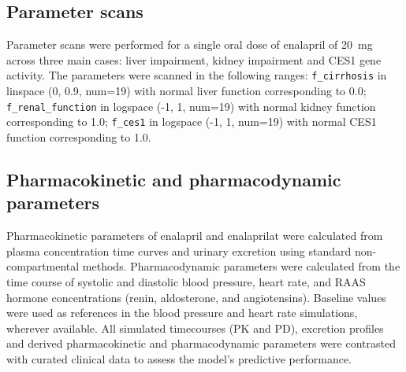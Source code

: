 \subsection{Parameter scans}
\label{sec:methods_scans}
Parameter scans were performed for a single oral dose of enalapril of 20~mg across three main cases: liver impairment, kidney impairment and CES1 gene activity. The parameters were scanned in the following ranges: \texttt{f\_cirrhosis} in linspace (0, 0.9, num=19) with normal liver function corresponding to 0.0; \texttt{f\_renal\_function} in logspace (-1, 1, num=19) with normal kidney function corresponding to 1.0; \texttt{f\_ces1} in logspace (-1, 1, num=19) with normal CES1 function corresponding to 1.0. 

\subsection{Pharmacokinetic and pharmacodynamic parameters}
\label{sec:methods_pkpd_parameters}
Pharmacokinetic parameters of enalapril and enalaprilat were calculated from plasma concentration time curves and urinary excretion using standard non-compartmental methods. Pharmacodynamic parameters were calculated from the time course of systolic and diastolic blood pressure, heart rate, and RAAS hormone concentrations (renin, aldosterone, and angiotensins). Baseline values were used as references in the blood pressure and heart rate simulations, wherever available. All simulated timecourses (PK and PD), excretion profiles and derived pharmacokinetic and pharmacodynamic parameters were contrasted with curated clinical data to assess the model's predictive performance. 